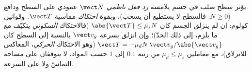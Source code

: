 \begin{proposition}\label{prop:b1:newton-dynamics:friction}
يؤثر سطح صلب في جسم يلامسه  \emph{رد فعل ناظمي}
$\vect N$ عمودي على السطح ودافع ($N \geq 0$: فالسطح
لا يستطيع أن يسحب)، وبقوة \emph{احتكاك} مماسية $\vect T$.
وقوانين كولوم: إن لم ينزلق الجسم كان $\abs{\vect T} \leq \mu_s N$
(فالاحتكاك \emph{السكوني} يتكيّف مع ما يلزم، إلى ذلك الحدّ)؛
وإن انزلق بسرعة $\vect v_g$ بالنسبة إلى السطح كان
$\vect T = -\mu_d N\,\vect v_g/\abs{\vect v_g}$ (وهو الاحتكاك \emph{الحركي}،
المعاكس للانزلاق)، مع معاملين $\mu_d \leq \mu_s$ من رتبة
$0.1$ إلى $1$ حسب المواد، لا يتوقفان على مساحة التماسّ
ولا على السرعة.
\end{proposition}
\admitted

